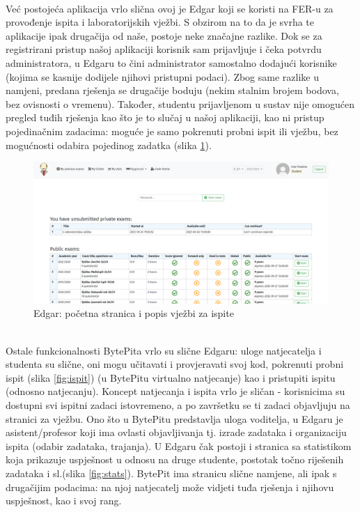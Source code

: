 		\noindent\\
		Već postojeća aplikacija vrlo slična ovoj je Edgar koji se koristi na FER-u za provođenje ispita i laboratorijskih vježbi.	S obzirom na to da je svrha te aplikacije ipak drugačija od naše, postoje neke značajne razlike. Dok se za registrirani pristup našoj aplikaciji korisnik sam prijavljuje i čeka potvrdu administratora, u Edgaru to čini administrator samostalno dodajući korisnike (kojima se kasnije dodijele njihovi pristupni podaci). Zbog same razlike u namjeni, predana rješenja se drugačije boduju (nekim stalnim brojem bodova, bez ovisnosti o vremenu). Također, studentu prijavljenom u sustav nije omogućen pregled tuđih rješenja kao što je to slučaj u našoj aplikaciji, kao ni pristup pojedinačnim zadacima: moguće je samo pokrenuti probni ispit ili vježbu, bez mogućnosti odabira pojedinog zadatka (slika  \ref{fig:pocstr}).\\
			\begin{figure}[H]
			\includegraphics[scale=0.4]{slike/edgar1}
			\centering
			\caption{Edgar: početna stranica i popis vježbi za ispite}
			\label{fig:pocstr}
		\end{figure}
				\noindent\\
		Ostale funkcionalnosti BytePita vrlo su slične Edgaru: uloge natjecatelja i studenta su slične, oni mogu učitavati i provjeravati svoj kod, pokrenuti probni ispit (slika \ref{fig:ispit}) (u BytePitu virtualno natjecanje) kao i pristupiti ispitu (odnosno natjecanju). Koncept natjecanja i ispita vrlo je sličan - korisnicima su dostupni svi ispitni zadaci istovremeno, a po završetku se ti zadaci objavljuju na stranici za vježbu. 
		Ono što u BytePitu predstavlja uloga voditelja, u Edgaru je asistent/profesor koji ima ovlasti objavljivanja tj. izrade zadataka i organizaciju ispita (odabir zadataka, trajanja). U Edgaru čak postoji i stranica sa statistikom koja prikazuje uspješnost u odnosu na druge studente, postotak točno riješenih zadataka i sl.(slika  \ref{fig:stats}). BytePit ima stranicu slične namjene, ali ipak s drugačijim podacima: na njoj natjecatelj može vidjeti tuđa rješenja i njihovu uspješnost, kao i svoj rang.	\\
		
